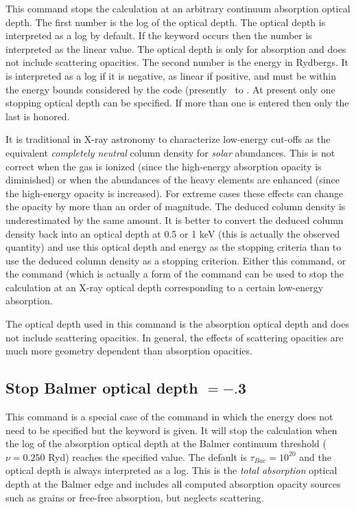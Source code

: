This command stops the calculation at an arbitrary continuum absorption
optical depth.
The first number is the log of the optical depth.
The optical depth is interpreted as a log by default.
If the  keyword
occurs then the number is interpreted as the linear value.
The optical
depth is only for absorption and does not include scattering opacities.
The second number is the energy in Rydbergs.
It is interpreted as a log
if it is negative, as linear if positive, and must be within the energy
bounds considered by the code (presently \emm\ to
\egamry .
At present only one stopping optical depth can be specified.
If more than
one is entered then only the last is honored.

It is traditional in X-ray astronomy to characterize low-energy cut-offs
as the equivalent \emph{completely neutral} column density
for \emph{solar} abundances.
This is not correct when the gas is ionized
(since the high-energy absorption
opacity is diminished) or when the abundances of the heavy elements are
enhanced (since the high-energy opacity is increased).
For extreme cases
these effects can change the opacity by more than an order of magnitude.
The deduced column density is underestimated by the same amount.
It is
better to convert the deduced column density back into an optical depth
at 0.5 or 1 keV (this is actually the observed quantity)
and use this optical
depth and energy as the stopping criteria than to use the deduced column
density as a stopping criterion.
Either this command, or the  command (which is actually a form of the
 command can be used to stop
the calculation
at an X-ray optical depth corresponding to a certain low-energy absorption.

The optical depth used in this command is the absorption optical depth
and does not include scattering opacities.
In general, the effects of
scattering opacities are much more geometry dependent than absorption
opacities.

\subsection{Stop Balmer optical depth $= -.$3}

This command is a special case of the 
command in which the energy does not need to be specified
but the keyword  is given.
It will stop the calculation when the log of the absorption
optical depth
at the Balmer continuum threshold ($\nu = 0.250$ Ryd)
reaches the specified value.
The default is $\tau_{Bac} = 10^{20}$ and the optical depth
is always interpreted as a log.
This is the \emph{total absorption} optical depth at the Balmer edge
and includes all computed absorption opacity sources such as grains or
free-free absorption, but neglects scattering.

